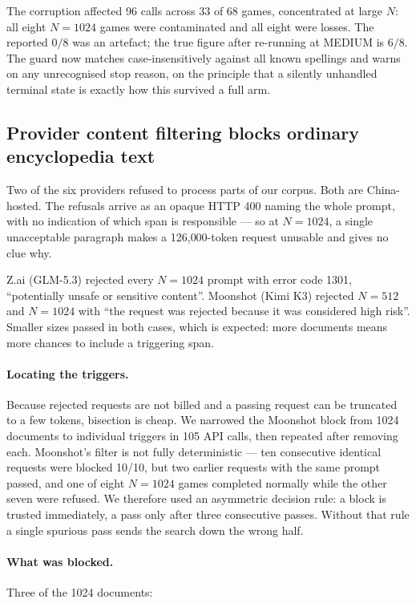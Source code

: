 \documentclass[11pt]{article}
\begin{document}
The corruption affected 96 calls across 33 of 68 games, concentrated at large
$N$: all eight $N{=}1024$ games were contaminated and all eight were losses. The
reported $0/8$ was an artefact; the true figure after re-running at MEDIUM is
$6/8$. The guard now matches case-insensitively against all known spellings and
warns on any unrecognised stop reason, on the principle that a silently
unhandled terminal state is exactly how this survived a full arm.

\subsection{Provider content filtering blocks ordinary encyclopedia text}
\label{sec:filter}

Two of the six providers refused to process parts of our corpus. Both are
China-hosted. The refusals arrive as an opaque HTTP 400 naming the whole prompt,
with no indication of which span is responsible --- so at $N{=}1024$, a single
unacceptable paragraph makes a 126{,}000-token request unusable and gives no
clue why.

Z.ai (GLM-5.3) rejected every $N{=}1024$ prompt with error code 1301,
``potentially unsafe or sensitive content''. Moonshot (Kimi K3) rejected
$N{=}512$ and $N{=}1024$ with ``the request was rejected because it was
considered high risk''. Smaller sizes passed in both cases, which is expected:
more documents means more chances to include a triggering span.

\paragraph{Locating the triggers.} Because rejected requests are not billed and
a passing request can be truncated to a few tokens, bisection is cheap. We
narrowed the Moonshot block from 1024 documents to individual triggers in 105
API calls, then repeated after removing each. Moonshot's filter is not fully
deterministic --- ten consecutive identical requests were blocked 10/10, but two
earlier requests with the same prompt passed, and one of eight $N{=}1024$ games
completed normally while the other seven were refused. We therefore used an
asymmetric decision rule: a block is trusted immediately, a pass only after
three consecutive passes. Without that rule a single spurious pass sends the
search down the wrong half.

\paragraph{What was blocked.} Three of the 1024 documents:
\end{document}
